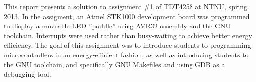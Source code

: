 This report presents a solution to assignment \#1 of TDT4258 at NTNU, spring 2013.
In the assigment, an Atmel STK1000 development board was programmed to display a moveable LED ''paddle'' using AVR32 assembly and the GNU toolchain.
Interrupts were used rather than busy-waiting to achieve better energy efficiency.
The goal of this assignment was to introduce students to programming microcontrollers in an energy-efficient fashion, as well as introducing students to the GNU toolchain, and specifically GNU Makefiles and using GDB as a debugging tool.
